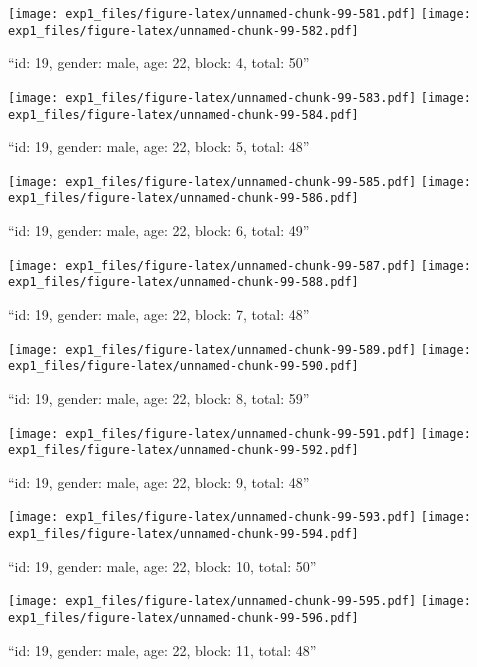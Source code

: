 \documentclass[,]{article}
\begin{document}
\texttt{[image: exp1\_files/figure-latex/unnamed-chunk-99-581.pdf]}
\texttt{[image: exp1\_files/figure-latex/unnamed-chunk-99-582.pdf]}

\newpage
[1] 

``id: 19, gender: male, age: 22, block: 4, total: 50''

\texttt{[image: exp1\_files/figure-latex/unnamed-chunk-99-583.pdf]}
\texttt{[image: exp1\_files/figure-latex/unnamed-chunk-99-584.pdf]}

\newpage
[1] 

``id: 19, gender: male, age: 22, block: 5, total: 48''

\texttt{[image: exp1\_files/figure-latex/unnamed-chunk-99-585.pdf]}
\texttt{[image: exp1\_files/figure-latex/unnamed-chunk-99-586.pdf]}

\newpage
[1] 

``id: 19, gender: male, age: 22, block: 6, total: 49''

\texttt{[image: exp1\_files/figure-latex/unnamed-chunk-99-587.pdf]}
\texttt{[image: exp1\_files/figure-latex/unnamed-chunk-99-588.pdf]}

\newpage
[1] 

``id: 19, gender: male, age: 22, block: 7, total: 48''

\texttt{[image: exp1\_files/figure-latex/unnamed-chunk-99-589.pdf]}
\texttt{[image: exp1\_files/figure-latex/unnamed-chunk-99-590.pdf]}

\newpage
[1] 

``id: 19, gender: male, age: 22, block: 8, total: 59''

\texttt{[image: exp1\_files/figure-latex/unnamed-chunk-99-591.pdf]}
\texttt{[image: exp1\_files/figure-latex/unnamed-chunk-99-592.pdf]}

\newpage
[1] 

``id: 19, gender: male, age: 22, block: 9, total: 48''

\texttt{[image: exp1\_files/figure-latex/unnamed-chunk-99-593.pdf]}
\texttt{[image: exp1\_files/figure-latex/unnamed-chunk-99-594.pdf]}

\newpage
[1] 

``id: 19, gender: male, age: 22, block: 10, total: 50''

\texttt{[image: exp1\_files/figure-latex/unnamed-chunk-99-595.pdf]}
\texttt{[image: exp1\_files/figure-latex/unnamed-chunk-99-596.pdf]}

\newpage
[1] 

``id: 19, gender: male, age: 22, block: 11, total: 48''
\end{document}
